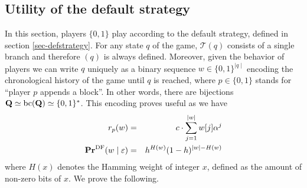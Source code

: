 \subsection{Utility of the default strategy}
\label{sec-defaultutility}
In this section, players $\{0,1\}$ play according to the default strategy, defined in section \ref{sec-defstrategy}. For any state $q$ of the game, $\mathcal{T}(q)$ consists of a single branch and therefore \bchain$(q)$ is always defined. Moreover, given the behavior of players we can write $q$ uniquely as a binary sequence $w\in\{0,1\}^{\mid q\mid }$ encoding the chronological history of the game until $q$ is reached, where $p\in\{0,1\}$ stands for ``player $p$ appends a block''. In other words, there are bijections $ \mathbf{Q} \simeq\text{bc}(\mathbf{Q})\simeq \{0,1\}^\ast$. This encoding proves useful as we have
\begin{eqnarray*}
	r_p(w) &=&	c\cdot \sum_{j=1}^{\mid w\mid}w[j] \alpha^j  \\
	\mathbf{Pr}^{\text{\rm DF}}(w \mid \varepsilon) &=&	h^{H(w)}(1-h)^{|w|-H(w)}
\end{eqnarray*}
where $H(x)$ denotes the Hamming weight of integer $x$, defined as the amount of non-zero bits of $x$. We prove the following.



